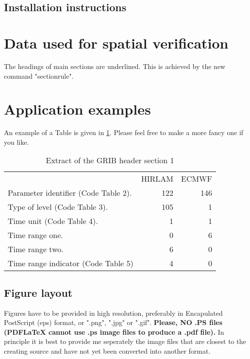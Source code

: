 \documentclass[11pt,a4paper]{article}
\begin{document}
\subsection{Installation instructions}
\section{Data used for spatial verification}

The headings of main sections are underlined. This is achieved by the new command "sectionrule".

\section{Application examples}

An example of a Table is given in \ref{tab:grib}. Please feel free to make a more fancy one if you like.

\begin{table}
{\center\it\caption{ \label{tab:grib}Extract of the GRIB header section 1}}
\begin{center}
\begin{tabular}{lrr}
                                        & HIRLAM & ECMWF \\
 Parameter identifier (Code Table 2).   &   122  & 146 \\
 Type of level (Code Table 3).          &   105  &   1 \\
 Time unit (Code Table 4).              &     1  &   1 \\
 Time range one.                        &     0  &   6 \\
 Time range two.                        &     6  &   0 \\
 Time range indicator (Code Table 5)    &     4  &   0 \\
\end{tabular}
\end{center}
\end{table} 

\subsection{Figure layout}
Figures have to be provided in high resolution, preferably in Encapulated PostScript (eps) format, or ".png", ".jpg" or ".gif". 
\textbf{Please, NO .PS files (PDFLaTeX cannot use .ps image files to produce a .pdf file).}
In principle it is best to provide me seperately the image files that are closest to the creating source and have not yet been converted into another format.
\end{document}

